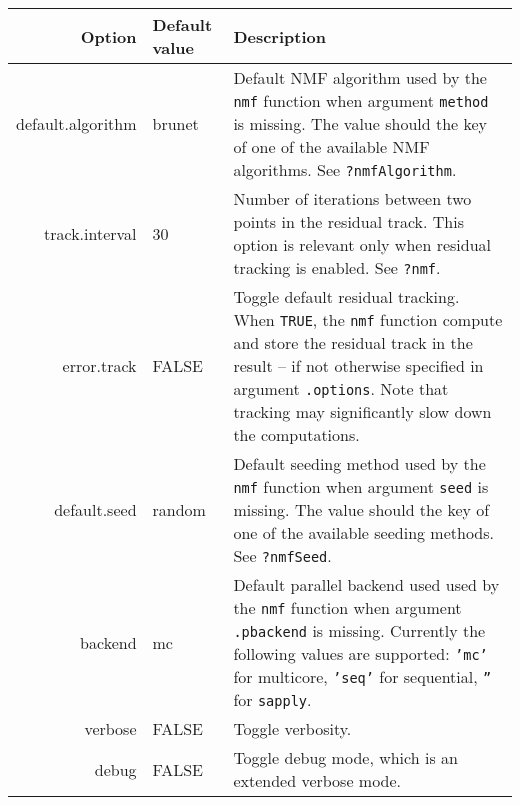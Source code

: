 \documentclass[a4paper]{article}\usepackage{graphicx, color}
\let\code=\texttt
\begin{document}
\begin{table}[ht]
\begin{center}
\begin{tabularx}{\textwidth}{>{\ttfamily}rlX}
  \hline
Option & Default value & Description\\ 
\hline
default.algorithm & brunet & Default NMF algorithm used by the \code{nmf} function when argument \code{method} is missing.
The value should the key of one of the available NMF algorithms. 
See \code{?nmfAlgorithm}.\\ 
track.interval & 30 & Number of iterations between two points in the residual track. 
This option is relevant only when residual tracking is enabled. 
See \code{?nmf}.\\ 
error.track & FALSE & Toggle default residual tracking. 
When \code{TRUE}, the \code{nmf} function compute and store the residual track in the result -- if not otherwise specified in argument \code{.options}.
Note that tracking may significantly slow down the computations.\\ 
default.seed & random & Default seeding method used by the \code{nmf} function when argument \code{seed} is missing.
The value should the key of one of the available seeding methods. 
See \code{?nmfSeed}.\\
backend & mc & Default parallel backend used used by the \code{nmf} function when argument \code{.pbackend} is missing.
Currently the following values are supported: \code{'mc'} for multicore, \code{'seq'} for sequential, \code{''} for \code{sapply}.\\
verbose & FALSE & Toggle verbosity.\\ 
debug & FALSE & Toggle debug mode, which is an extended verbose mode.\\ 
\hline
\end{tabularx}
\end{center}
\caption{}
\end{table}

\pagebreak 
\end{document}

